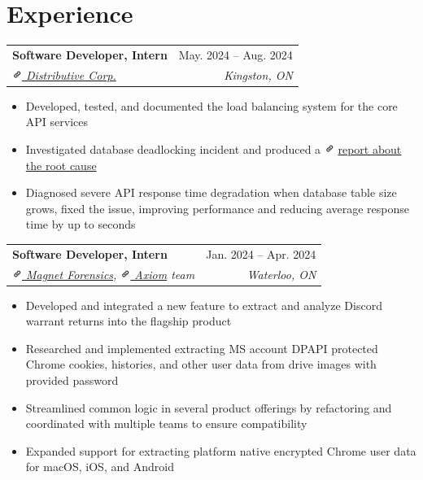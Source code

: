 \documentclass[letterpaper, 10pt]{report}
\makeatletter
\newcommand{\resumeSubheading}[4]{
    \begin{tabular*}{\textwidth}[t]{l@{\extracolsep{\fill}}r}
        \textbf{#1}       & #2                \\
        \textit{\small#3} & \textit{\small#4} \\
    \end{tabular*}\vspace{-0.7em}
}
\newenvironment{ResumeItem}{
    \vspace{-0.3em}
    \begin{itemize}
        \setlength\itemsep{-0.3em}
        }{
    \end{itemize}\vspace{-0.3em}}
\newcommand{\linkIcon}{\includegraphics[height=9pt, trim=0 5cm 0 -1.5cm]{./img/link-icon}}
\makeatother
\begin{document}
\section{Experience}
\resumeSubheading
{Software Developer, Intern}{May. 2024 -- Aug. 2024}
{\href{https://distributive.network/}{\linkIcon{} Distributive Corp.}}{Kingston, ON}
\begin{ResumeItem}
    \item{Developed, tested, and documented the load balancing system for the core API services}
    \item{Investigated database deadlocking incident and produced a \linkIcon{}
        \href{https://internal-compiler-error.com/mysql-read-commited-gap-lock.html}{report about the root cause}
    }
    \item{Diagnosed severe API response time degradation when database table size grows, fixed the issue, improving performance and reducing average response time by up to seconds}
\end{ResumeItem}

\resumeSubheading
{Software Developer, Intern}{Jan. 2024 -- Apr. 2024}
{\href{https://www.magnetforensics.com/}{\linkIcon{} Magnet Forensics}, \href{https://www.magnetforensics.com/products/magnet-axiom/}{\linkIcon{} Axiom} team}{Waterloo, ON}
\begin{ResumeItem}
    \item{Developed and integrated a new feature to extract and analyze Discord warrant returns into the flagship product}
    \item{Researched and implemented extracting MS account DPAPI protected Chrome cookies, histories, and other user data from drive images with provided password}
    \item{Streamlined common logic in several product offerings by refactoring and coordinated with multiple teams to ensure compatibility}
    \item{Expanded support for extracting platform native encrypted Chrome user data for macOS, iOS, and Android}
\end{ResumeItem}

\end{document}
